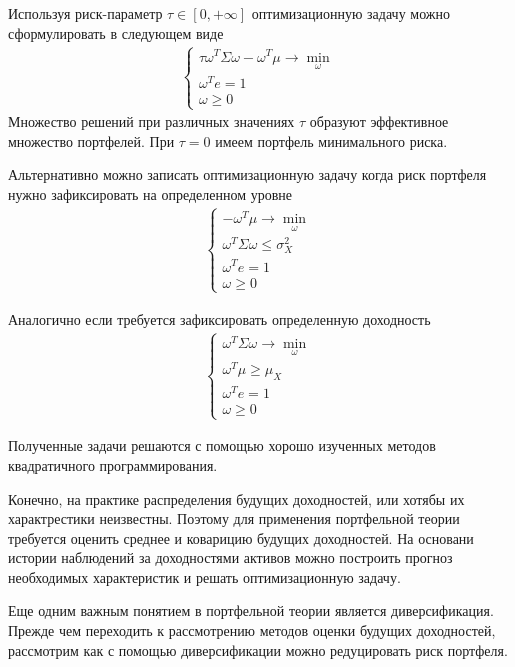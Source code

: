 Используя риск-параметр $\tau \in [0, +\infty]$ оптимизационную задачу можно сформулировать в следующем виде
\begin{align}
	\begin{cases}
		\tau \omega^T \Sigma \omega - \omega^T \mu \rightarrow \min_{\omega} \\
		\omega^T e = 1 \\
		\omega \ge 0
	\end{cases}
\end{align}
Множество решений при различных значениях $\tau$ образуют эффективное множество портфелей.
При $\tau = 0$ имеем портфель минимального риска.

Альтернативно можно записать оптимизационную задачу когда риск портфеля нужно зафиксировать на определенном уровне
\begin{align}
	\begin{cases}
		-\omega^T \mu \rightarrow \min_{\omega} \\
		\omega^T \Sigma \omega \le \sigma_X^2 \\
		\omega^T e = 1 \\
		\omega \ge 0
	\end{cases}
\end{align}

Аналогично если требуется зафиксировать определенную доходность
\begin{align}
	\begin{cases}
		\omega^T \Sigma \omega \rightarrow \min_{\omega} \\
		\omega^T \mu \ge \mu_X \\
		\omega^T e = 1 \\
		\omega \ge 0
	\end{cases}
\end{align}

Полученные задачи решаются с помощью хорошо изученных методов квадратичного программирования.

Конечно, на практике распределения будущих доходностей, или хотябы их характрестики неизвестны.
Поэтому для применения портфельной теории требуется оценить среднее и коварицию будущих доходностей.
На основани истории наблюдений за доходностями активов можно построить прогноз необходимых характеристик
и решать оптимизационную задачу.

Еще одним важным понятием в портфельной теории является диверсификация. Прежде чем переходить к рассмотрению методов оценки
будущих доходностей, рассмотрим как с помощью диверсификации можно редуцировать риск портфеля.

